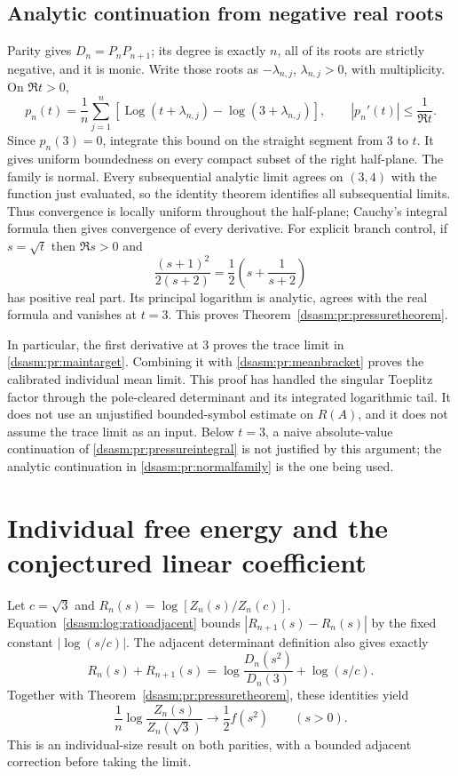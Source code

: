 \documentclass[11pt,letterpaper]{article}
\theoremstyle{remark}\newtheorem{remark}[theorem]{Remark}
\begin{document}
\subsection{Analytic continuation from negative real roots}
Parity gives $D_n=P_nP_{n+1}$; its degree is exactly $n$, all of its
roots are strictly negative, and it is monic. Write those roots as
$-\lambda_{n,j}$, $\lambda_{n,j}>0$, with multiplicity. On $\Re t>0$,
\begin{equation}\label{dsasm:pr:normalfamily}
 p_n(t)=\frac1n\sum_{j=1}^n
  [\operatorname{Log}(t+\lambda_{n,j})-\log(3+\lambda_{n,j})],
 \qquad |p_n'(t)|\le\frac1{\Re t}.
\end{equation}
Since $p_n(3)=0$, integrate this bound on the straight segment from
$3$ to $t$. It gives uniform boundedness on every compact subset
of the right half-plane. The family is normal. Every subsequential
analytic limit agrees on $(3,4)$ with the function just evaluated,
so the identity theorem identifies all subsequential limits. Thus
convergence is locally uniform throughout the half-plane; Cauchy's
integral formula then gives convergence of every derivative.
For explicit branch control, if $s=\sqrt t$ then $\Re s>0$ and
\[
 \frac{(s+1)^2}{2(s+2)}=\frac12\left(s+\frac1{s+2}\right)
\]
has positive real part. Its principal logarithm is analytic, agrees
with the real formula and vanishes at $t=3$.
This proves Theorem~\ref{dsasm:pr:pressuretheorem}.

In particular, the first derivative at $3$ proves the trace limit
in \eqref{dsasm:pr:maintarget}. Combining it with \eqref{dsasm:pr:meanbracket} proves
the calibrated individual mean limit. This proof has handled the
singular Toeplitz factor through the pole-cleared determinant and its
integrated logarithmic tail. It does not use an unjustified
bounded-symbol estimate on $R(A)$, and it does not assume the trace
limit as an input. Below $t=3$, a naive absolute-value continuation
of \eqref{dsasm:pr:pressureintegral} is not justified by this argument; the
analytic continuation in \eqref{dsasm:pr:normalfamily} is the one being used.
\section{Individual free energy and the conjectured linear coefficient}
\label{dsasm:pr:sec:freeenergy}
Let $c=\sqrt3$ and $R_n(s)=\log[Z_n(s)/Z_n(c)]$.
Equation~\eqref{dsasm:log:ratioadjacent} bounds
$|R_{n+1}(s)-R_n(s)|$ by the fixed constant $|\log(s/c)|$.
The adjacent determinant definition also gives exactly
\[
 R_n(s)+R_{n+1}(s)=\log\frac{D_n(s^2)}{D_n(3)}+\log(s/c).
\]
Together with Theorem~\ref{dsasm:pr:pressuretheorem}, these identities yield
\begin{equation}\label{dsasm:pr:individualpressure}
 \frac1n\log\frac{Z_n(s)}{Z_n(\sqrt3)}\longrightarrow\frac12f(s^2)
 \qquad(s>0).
\end{equation}
This is an individual-size result on both parities, with a bounded
adjacent correction before taking the limit.
\end{document}
